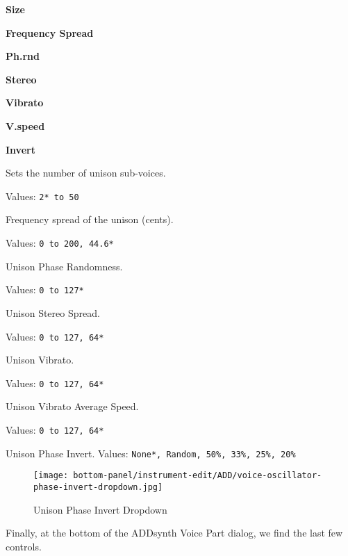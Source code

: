    \begin{enumber}
      \item \textbf{Size}
      \item \textbf{Frequency Spread}
      \item \textbf{Ph.rnd}
      \item \textbf{Stereo}
      \item \textbf{Vibrato}
      \item \textbf{V.speed}
      \item \textbf{Invert}
   \end{enumber}

   \setcounter{ItemCounter}{0}      %

   Sets the number of unison sub-voices.

   Values: \texttt{2* to 50}

   Frequency spread of the unison (cents).

   Values: \texttt{0 to 200, 44.6*}

   Unison Phase Randomness.

   Values: \texttt{0 to 127*}

   Unison Stereo Spread.

   Values: \texttt{0 to 127, 64*}

   Unison Vibrato.

   Values: \texttt{0 to 127, 64*}

   Unison Vibrato Average Speed.

   Values: \texttt{0 to 127, 64*}

   Unison Phase Invert.
   Values: \texttt{None*, Random, 50\%, 33\%, 25\%, 20\%}

\begin{figure}[H]
   \centering 
   \texttt{[image: bottom-panel/instrument-edit/ADD/voice-oscillator-phase-invert-dropdown.jpg]}
   \caption{Unison Phase Invert Dropdown}
   \label{fig:phase_invert_dropdown}
\end{figure}

   Finally, at the bottom of the ADDsynth Voice Part dialog, we find the
   last few controls.

   \setcounter{ItemCounter}{0}      %

